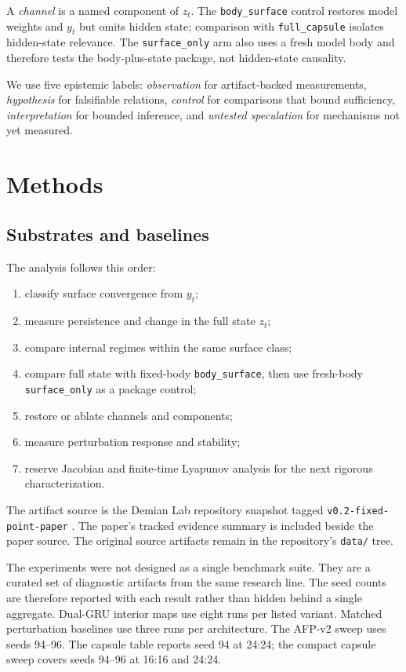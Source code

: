 \documentclass[11pt]{article}
\begin{document}
A \emph{channel} is a named component of $z_t$. The
\texttt{body\_surface} control restores model weights and $y_t$ but omits hidden
state; comparison with \texttt{full\_capsule} isolates hidden-state relevance.
The \texttt{surface\_only} arm also uses a fresh model body and therefore tests
the body-plus-state package, not hidden-state causality.

We use five epistemic labels: \emph{observation} for artifact-backed
measurements, \emph{hypothesis} for falsifiable relations, \emph{control} for
comparisons that bound sufficiency, \emph{interpretation} for bounded
inference, and \emph{untested speculation} for mechanisms not yet measured.


\section{Methods}

\subsection{Substrates and baselines}

The analysis follows this order:

\begin{enumerate}
  \item classify surface convergence from $y_t$;
  \item measure persistence and change in the full state $z_t$;
  \item compare internal regimes within the same surface class;
  \item compare full state with fixed-body \texttt{body\_surface}, then use fresh-body \texttt{surface\_only} as a package control;
  \item restore or ablate channels and components;
  \item measure perturbation response and stability;
  \item reserve Jacobian and finite-time Lyapunov analysis for the next rigorous characterization.
\end{enumerate}

The artifact source is the Demian Lab repository snapshot tagged
\texttt{v0.2-fixed-point-paper} \citep{demianlab2026}. The paper's tracked
evidence summary is included beside the paper source. The original source
artifacts remain in the repository's \texttt{data/} tree.

The experiments were not designed as a single benchmark suite. They are a
curated set of diagnostic artifacts from the same research line. The seed
counts are therefore reported with each result rather than hidden behind a
single aggregate. Dual-GRU interior maps use eight runs per listed variant.
Matched perturbation baselines use three runs per architecture. The AFP-v2
sweep uses seeds 94--96. The capsule table reports seed 94 at 24:24; the compact
capsule sweep covers seeds 94--96 at 16:16 and 24:24.
\end{document}
